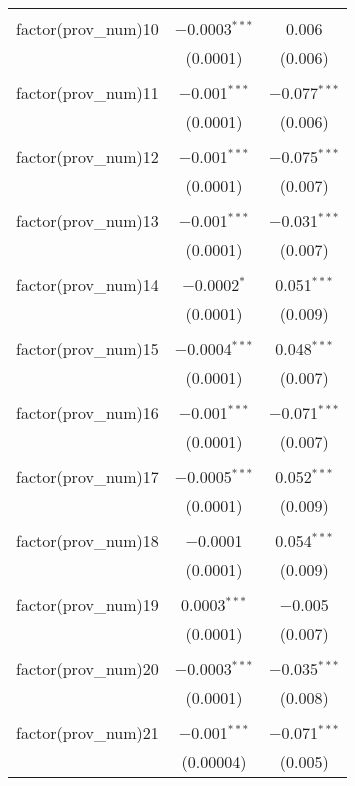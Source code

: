\begin{table}[ht!]
\begin{tabular}{@{\extracolsep{5pt}}lcc}
  & & \\ 
 factor(prov\_num)10 & $-$0.0003$^{***}$ & 0.006 \\ 
  & (0.0001) & (0.006) \\ 
  & & \\ 
 factor(prov\_num)11 & $-$0.001$^{***}$ & $-$0.077$^{***}$ \\ 
  & (0.0001) & (0.006) \\ 
  & & \\ 
 factor(prov\_num)12 & $-$0.001$^{***}$ & $-$0.075$^{***}$ \\ 
  & (0.0001) & (0.007) \\ 
  & & \\ 
 factor(prov\_num)13 & $-$0.001$^{***}$ & $-$0.031$^{***}$ \\ 
  & (0.0001) & (0.007) \\ 
  & & \\ 
 factor(prov\_num)14 & $-$0.0002$^{*}$ & 0.051$^{***}$ \\ 
  & (0.0001) & (0.009) \\ 
  & & \\ 
 factor(prov\_num)15 & $-$0.0004$^{***}$ & 0.048$^{***}$ \\ 
  & (0.0001) & (0.007) \\ 
  & & \\ 
 factor(prov\_num)16 & $-$0.001$^{***}$ & $-$0.071$^{***}$ \\ 
  & (0.0001) & (0.007) \\ 
  & & \\ 
 factor(prov\_num)17 & $-$0.0005$^{***}$ & 0.052$^{***}$ \\ 
  & (0.0001) & (0.009) \\ 
  & & \\ 
 factor(prov\_num)18 & $-$0.0001 & 0.054$^{***}$ \\ 
  & (0.0001) & (0.009) \\ 
  & & \\ 
 factor(prov\_num)19 & 0.0003$^{***}$ & $-$0.005 \\ 
  & (0.0001) & (0.007) \\ 
  & & \\ 
 factor(prov\_num)20 & $-$0.0003$^{***}$ & $-$0.035$^{***}$ \\ 
  & (0.0001) & (0.008) \\ 
  & & \\ 
 factor(prov\_num)21 & $-$0.001$^{***}$ & $-$0.071$^{***}$ \\ 
  & (0.00004) & (0.005) \\ 

\end{tabular}
\end{table}
